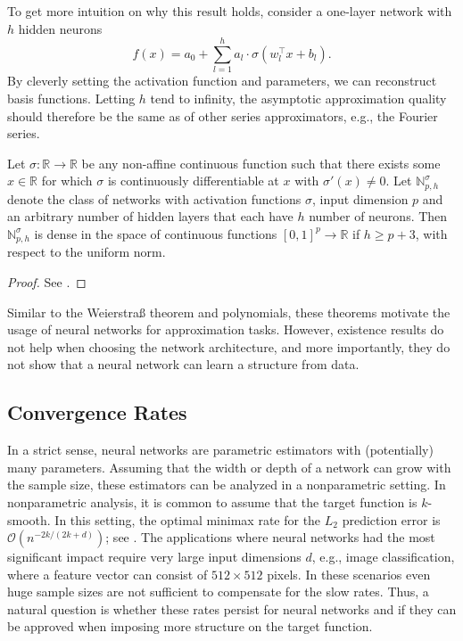 To get more intuition on why this result holds, consider a one-layer network with $h$
hidden neurons
\[
    f(x) = a_0 + \sum_{l = 1}^h a_l \cdot \sigma(w_l^\top x + b_l).
\]
By cleverly setting the activation function and parameters, we can reconstruct basis
functions. Letting $h$ tend to infinity, the asymptotic approximation quality should
therefore be the same as of other series approximators, e.g., the Fourier series.

\begin{theorem}
    Let $\sigma : \mathbb{R} \to \mathbb{R}$ be any non-affine continuous function such
    that there exists some $x \in \mathbb{R}$ for which $\sigma$ is continuously
    differentiable at $x$ with $\sigma'(x) \neq 0$. Let $\mathbb{N}_{p, h}^\sigma$
    denote the class of networks with activation functions $\sigma$, input dimension
    $p$ and an arbitrary number of hidden layers that each have $h$ number of neurons.
    Then $\mathbb{N}_{p,h}^\sigma$ is dense in the space of continuous functions
    $[0, 1]^p \to \mathbb{R}$ if $h \geq p + 3$, with respect to the uniform norm.
\end{theorem}
\begin{proof}
    See \cite{Kidger.2020}.
\end{proof}

Similar to the Weierstra{\ss} theorem and polynomials, these theorems motivate the usage
of neural networks for approximation tasks. However, existence results do not help when
choosing the network architecture, and more importantly, they do not show that a neural
network can learn a structure from data.

\subsection{Convergence Rates}

In a strict sense, neural networks are parametric estimators with (potentially) many
parameters. Assuming that the width or depth of a network can grow with the sample size,
these estimators can be analyzed in a nonparametric setting. In nonparametric analysis,
it is common to assume that the target function is $k$-smooth. In this setting, the
optimal minimax rate for the $L_2$ prediction error is $\mathcal{O}(n^{-2k/(2k+d)})$;
see \cite{Stone.1982}. The applications where neural networks had the most significant
impact require very large input dimensions $d$, e.g., image classification, where a
feature vector can consist of $512 \times 512$ pixels. In these scenarios even huge
sample sizes are not sufficient to compensate for the slow rates. Thus, a natural
question is whether these rates persist for neural networks and if they can be approved
when imposing more structure on the target function.


